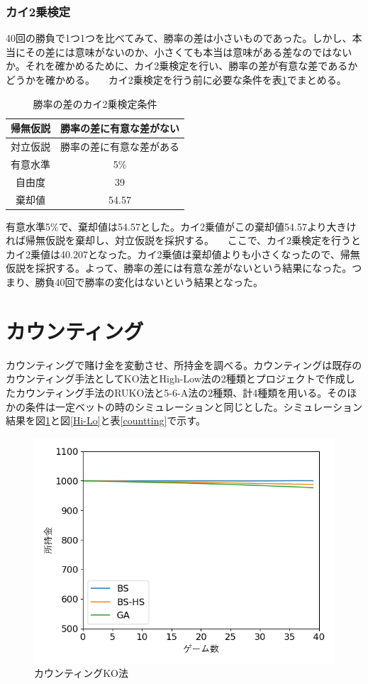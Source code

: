 \subsubsection{カイ2乗検定}
40回の勝負で1つ1つを比べてみて、勝率の差は小さいものであった。しかし、本当にその差には意味がないのか、小さくても本当は意味がある差なのではないか。それを確かめるために、カイ2乗検定を行い、勝率の差が有意な差であるかどうかを確かめる。
　カイ2乗検定を行う前に必要な条件を表\ref{win-x}でまとめる。
\begin{table}[H]
 \caption{勝率の差のカイ2乗検定条件\label{win-x}}
 \begin{center}
  \begin{tabular}{|c|c|}
  \hline 帰無仮説 & 勝率の差に有意な差がない \\
  \hline 対立仮説 & 勝率の差に有意な差がある \\
  \hline 有意水準 & 5\% \\
  \hline 自由度 & 39 \\
  \hline 棄却値 & 54.57\\
  \hline
  \end{tabular}
 \end{center}
\end{table}
有意水準5\%で、棄却値は54.57とした。カイ2乗値がこの棄却値54.57より大きければ帰無仮説を棄却し、対立仮説を採択する。
　ここで、カイ2乗検定を行うとカイ2乗値は40.207となった。カイ2乗値は棄却値よりも小さくなったので、帰無仮説を採択する。よって、勝率の差には有意な差がないという結果になった。つまり、勝負40回で勝率の変化はないという結果となった。

\section{カウンティング}
カウンティングで賭け金を変動させ、所持金を調べる。カウンティングは既存のカウンティング手法としてKO法とHigh-Low法の2種類とプロジェクトで作成したカウンティング手法のRUKO法と5-6-A法の2種類、計4種類を用いる。そのほかの条件は一定ベットの時のシミュレーションと同じとした。シミュレーション結果を図\ref{KO}と図\ref{Hi-Lo}と表\ref{countting}で示す。
\begin{figure}[H]
 \begin{center} 
  \includegraphics[width=0.7\linewidth]{./figure/KO}
  \caption{カウンティングKO法\label{KO}}
 \end{center}
\end{figure}

